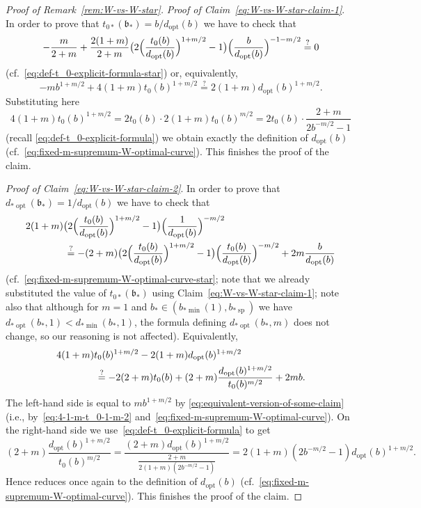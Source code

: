 \documentclass[a4paper]{amsart} %
\theoremstyle{definition}
\theoremstyle{remark}
\numberwithin{equation}{section}
\newcommand*{\bStar}{b_*}
\newcommand*{\tZeroStar}{t_{0*}}
\newcommand*{\dOpt}{d_{\mathrm{opt}}}
\newcommand*{\bMinStar}{b_{*\!\min}}
\newcommand*{\dMinStar}{d_{*\!\min}}
\newcommand*{\dOptStar}{d_{*\!\operatorname{opt}}}
\newcommand*{\bShStar}{b_{*\!\operatorname{sp}}}
\newcommand*{\bStarWvsWStar}{\mathfrak{b}_*}
\begin{document}
\begin{proof}[Proof of Remark~\ref{rem:W-vs-W-star}]
	\emph{Proof of Claim~\eqref{eq:W-vs-W-star-claim-1}}.
	In order to prove that $ \tZeroStar(\bStarWvsWStar) = b/\dOpt(b)$
	we have to check that
	\[
	-\frac{m}{2+m} + \frac{2(1+m)}{2+m} \bigl(2 \Bigl( \frac{t_0(b)}{\dOpt(b)}\Bigr)^{1+m/2} - 1 \bigr) \Bigl( \frac{b}{\dOpt(b)}\Bigr) ^{-1-m/2} \overset{?}{=} 0
	\]
	(cf.~\eqref{eq:def-t_0-explicit-formula-star})
	or, equivalently,
	\begin{equation}
	\label{eq:equivalent-version-of-some-claim}
	-mb^{1+m/2} + 4(1+m)  t_0(b)^{1+m/2} \overset{?}{=}  2(1+m) \dOpt(b)^{1+m/2}.
	\end{equation}
	Substituting here
	\begin{equation}
	\label{eq:4-1-m-t_0-1-m-2}
	4(1+m)  t_0(b)^{1+m/2} = 2t_0(b) \cdot 2(1+m)t_0(b)^{m/2} = 2t_0(b) \cdot \frac{2+m}{2b^{-m/2} - 1}
	\end{equation}
	(recall \eqref{eq:def-t_0-explicit-formula})
	we obtain exactly the definition of $\dOpt(b)$
	(cf.~\eqref{eq:fixed-m-supremum-W-optimal-curve}).	
	This finishes the proof of the  claim.	
	
	\emph{Proof of Claim~\eqref{eq:W-vs-W-star-claim-2}}.
	In order to prove that $\dOptStar(\bStarWvsWStar)  =1/\dOpt(b)$
	we have to check that
	\begin{align*}
	\MoveEqLeft[4]
	2(1+m)
	\bigl(2 \Bigl(\frac{t_0(b)}{\dOpt(b)}\Bigr)^{1+m/2} -1\bigr)  \Bigl(\frac{1}{\dOpt(b)}\Bigr)^{-m/2} \\
	&\overset{?}{=}
	-(2+m)\bigl(2\Bigl(\frac{t_0(b)}{\dOpt(b)}\Bigr)^{1+m/2} -1\bigr)
	\Bigl(\frac{t_0(b)}{\dOpt(b)}\Bigr)^{-m/2}
	+2m \frac{b}{\dOpt(b)}
	\end{align*}
	(cf.~\eqref{eq:fixed-m-supremum-W-optimal-curve-star}; 
	note that we already substituted the value of $\tZeroStar(\bStarWvsWStar) $ 
	using Claim~\eqref{eq:W-vs-W-star-claim-1};
	note also that although for $m=1$ and $\bStar\in (\bMinStar(1),\bShStar)$ we have
	$\dOptStar(\bStar, 1) < \dMinStar(\bStar, 1)$, the
	formula defining $\dOptStar(\bStar,m)$ 
	does not change,
	so our reasoning is not affected).
	Equivalently,
	\begin{align*}
	\MoveEqLeft[4]
	4(1+m) t_0(b)^{1+m/2} - 2(1+m)\dOpt(b)^{1+m/2} \\
	&\overset{?}{=}
	-2(2+m) t_0(b) +  (2+m)\frac{\dOpt(b)^{1+m/2}}{t_0(b)^{m/2}}
	+2mb.
	\end{align*}
	The left-hand side is equal to $m b^{1+m/2}$ by \eqref{eq:equivalent-version-of-some-claim}
	(i.e., by~\eqref{eq:4-1-m-t_0-1-m-2} and~\eqref{eq:fixed-m-supremum-W-optimal-curve}).
	On the right-hand side we use~\eqref{eq:def-t_0-explicit-formula} to get
	\[
	(2+m)\frac{\dOpt(b)^{1+m/2}}{t_0(b)^{m/2}} = \frac{(2+m)\dOpt(b)^{1+m/2}}{\frac{2+m}{2(1+m)(2b^{-m/2} - 1)}} 
	= 2(1+m)(2b^{-m/2} - 1)\dOpt(b)^{1+m/2}.
	\]
	Hence reduces once again to the definition of $\dOpt(b)$
	(cf.~\eqref{eq:fixed-m-supremum-W-optimal-curve}).	
	This finishes the proof of the claim.
	

\end{proof}
\end{document}
